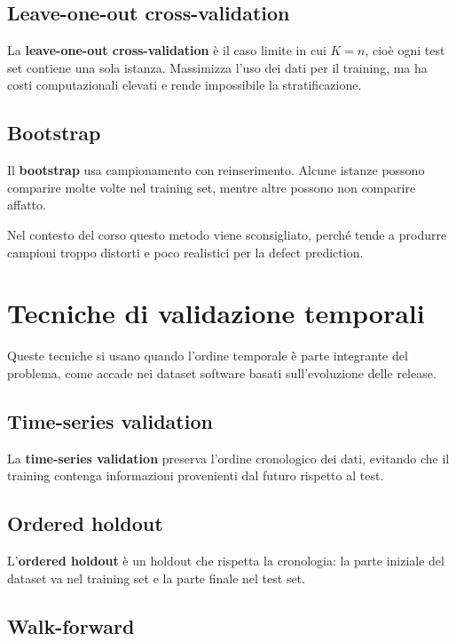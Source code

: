 \subsection{Leave-one-out cross-validation}

La \textbf{leave-one-out cross-validation} è il caso limite in cui \(K=n\), cioè ogni test set contiene una sola istanza. Massimizza l'uso dei dati per il training, ma ha costi computazionali elevati e rende impossibile la stratificazione.

\subsection{Bootstrap}

Il \textbf{bootstrap} usa campionamento con reinserimento. Alcune istanze possono comparire molte volte nel training set, mentre altre possono non comparire affatto.

\begin{notaprof}
Nel contesto del corso questo metodo viene sconsigliato, perché tende a produrre campioni troppo distorti e poco realistici per la defect prediction.
\end{notaprof}

\section{Tecniche di validazione temporali}

Queste tecniche si usano quando l'ordine temporale è parte integrante del problema, come accade nei dataset software basati sull'evoluzione delle release.

\subsection{Time-series validation}

La \textbf{time-series validation} preserva l'ordine cronologico dei dati, evitando che il training contenga informazioni provenienti dal futuro rispetto al test.

\subsection{Ordered holdout}

L'\textbf{ordered holdout} è un holdout che rispetta la cronologia: la parte iniziale del dataset va nel training set e la parte finale nel test set.

\subsection{Walk-forward}


